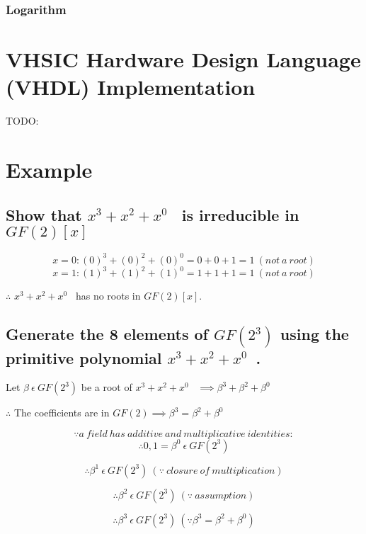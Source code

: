 \documentclass[paper=usletter, fontsize=12pt]{article}
\newcommand{\polynomial}{$x^{3}+x^{2}+x^{0}$}
\begin{document}
            \subsubsection{Logarithm}

            \newpage

    \section{VHSIC Hardware Design Language (VHDL) Implementation}
    TODO:

    \section{Example}
        \subsection{Show that \polynomial~ is irreducible in $GF(2)[x]$}

            \[ x=0: (0)^{3}+(0)^{2}+(0)^{0}=0+0+1=1 \ (not \ a \ root) \]
            \[ x=1: (1)^{3}+(1)^{2}+(1)^{0}=1+1+1=1 \ (not \ a \ root) \]
            \centerline{$\therefore$ \polynomial~ has no roots in $GF(2)[x]$.}

        \subsection{Generate the 8 elements of $GF(2^{3})$ using the primitive polynomial \polynomial~.}

            \centerline{Let $\beta \ \epsilon \ GF(2^{3})$ be a root of \polynomial~ $\implies \beta^{3}+\beta^{2}+\beta^{0}$}

            \hspace*{\fill}
            \centerline{$\therefore$ The coefficients are in $GF(2) \implies \beta^{3}=\beta^{2}+\beta^{0}$}

            \[ \because a \ field \ has \ additive \ and \ multiplicative \ identities: \]
            \[ \therefore 0, 1=\beta^{0} \ \epsilon \ GF(2^{3}) \]

            \[ \therefore \beta^{1} \ \epsilon \ GF(2^{3}) \ (\because \ closure \ of \ multiplication) \]

            \[ \therefore \beta^{2} \ \epsilon \ GF(2^{3}) \ (\because \ assumption) \]

            \[ \therefore \beta^{3} \ \epsilon \ GF(2^{3}) \ (\because \beta^{3}=\beta^{2}+\beta^{0}) \]
\end{document}
